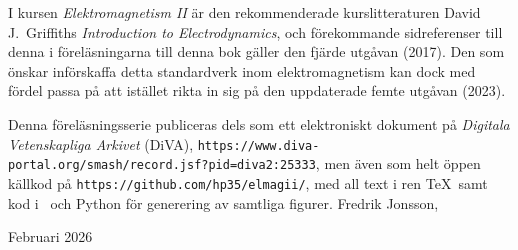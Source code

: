 {  \bigskip{}\medskip\noindent
  I kursen {\it Elektromagnetism II} {\"a}r den rekommenderade kurslitteraturen
  David J.~Griffiths {\it Introduction to Electrodynamics}, och f{\"o}rekommande
  sidreferenser till denna i f{\"o}rel{\"a}sningarna till denna bok g{\"a}ller
  den fj{\"a}rde utg{\aa}van (2017). Den som {\"o}nskar inf{\"o}rskaffa detta
  standardverk inom elektromagnetism kan dock med f{\"o}rdel passa p{\aa} att
  ist{\"a}llet rikta in sig p{\aa} den uppdaterade femte utg{\aa}van (2023).

  \bigskip{}\medskip\noindent
  Denna f{\"o}rel{\"a}sningsserie publiceras dels som ett elektroniskt dokument
  p{\aa} {\it Digitala Vetenskapliga Arkivet} (DiVA),
  {\tt https://www.diva-portal.org/smash/record.jsf?pid=diva2:25333}, men
  {\"a}ven som helt {\"o}ppen k{\"a}ll\-kod p{\aa}
  {\tt https://github.com/hp35/elmagii/}, med all text i ren \TeX\ samt kod
  i \MP\ och Python f{\"o}r generering av samtliga figurer.
  \vskip32pt
  \noindent Fredrik Jonsson,\par
  \noindent Februari 2026}

%
%


%
%

%
%



%
%



